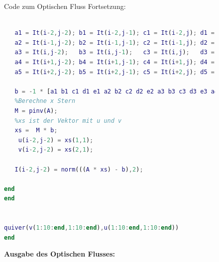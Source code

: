 \documentclass[12pt,a4paper,oneside]{article}
\begin{document}
\begin{figure} 

Code zum Optischen Fluss Fortsetzung:
\begin{lstlisting}[language=Matlab,
frame=single,breaklines=true,keepspaces=true]
   
   a1 = It(i-2,j-2); b1 = It(i-2,j-1); c1 = It(i-2,j); d1 = It(i-2,j+1); e1 = It(i-2,j+2);
   a2 = It(i-1,j-2); b2 = It(i-1,j-1); c2 = It(i-1,j); d2 = It(i-1,j+1); e2 = It(i-1,j+2);
   a3 = It(i,j-2);   b3 = It(i,j-1);   c3 = It(i,j);   d3 = It(i,j+1);   e3 = It(i,j+2);
   a4 = It(i+1,j-2); b4 = It(i+1,j-1); c4 = It(i+1,j); d4 = It(i+1,j+1); e4 = It(i+1,j+2);
   a5 = It(i+2,j-2); b5 = It(i+2,j-1); c5 = It(i+2,j); d5 = It(i+2,j+1); e5 = It(i+2,j+2);
   
   b = -1 * [a1 b1 c1 d1 e1 a2 b2 c2 d2 e2 a3 b3 c3 d3 e3 a4 b4 c4 d4 e4 a5 b5 c5 d5 e5]';  
   %Berechne x Stern
   M = pinv(A);
   %xs ist der Vektor mit u und v
   xs =  M * b;
    u(i-2,j-2) = xs(1,1);
    v(i-2,j-2) = xs(2,1);
   
   I(i-2,j-2) = norm(((A * xs) - b),2);
         
end
end


quiver(v(1:10:end,1:10:end),u(1:10:end,1:10:end))
end

\end{lstlisting}

\textbf{Ausgabe des Optischen Flusses:\\}



\end{figure} 
\end{document}
